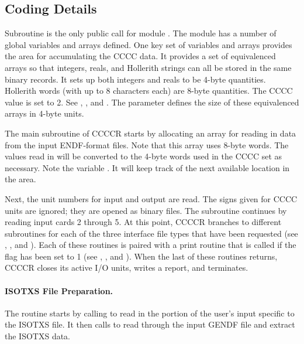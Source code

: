 \subsection{Coding Details}
\label{ssCCCCR_code}

Subroutine 
is the only public call for
module .
The module has a number of global variables and
arrays defined.  One key set of variables and arrays provides the
area for accumulating the CCCC data.  It provides a set of
equivalenced arrays so that integers, reals, and Hollerith strings
can all be stored in the same binary records.  It sets up both
integers and reals to be 4-byte quantities.  Hollerith words
(with up to 8 characters each) are 8-byte quantities.  The CCCC
 value is set to 2.  See ,
, and .  The parameter
 defines the size of these equivalenced arrays
in 4-byte units.

The main subroutine of CCCCR starts by allocating an array 
for reading in data from the input ENDF-format files.  Note that this
array uses 8-byte words.  The values read in will be converted to the
4-byte words used in the CCCC  set as necessary.  Note
the variable .  It will keep track of the next available
location in the  area.

Next, the unit numbers for input and output are read.  The signs given
for CCCC units are ignored; they are opened as binary files.  The
subroutine continues by reading input cards 2 through 5.  At this
point, CCCCR branches to different subroutines for each of the three
interface file types that have been requested (see
,
, and
).  Each of these routines is
paired with a print routine that is called if the  flag has
been set to 1 (see ,
, and
).
When the last of these routines returns, CCCCR closes its active
I/O units, writes a report, and terminates.

\paragraph{ISOTXS File Preparation.}
The  routine starts by calling
 to read in
the portion of the user's input specific to the ISOTXS file.  It then
calls  to read through the
input GENDF file and extract the ISOTXS data.

